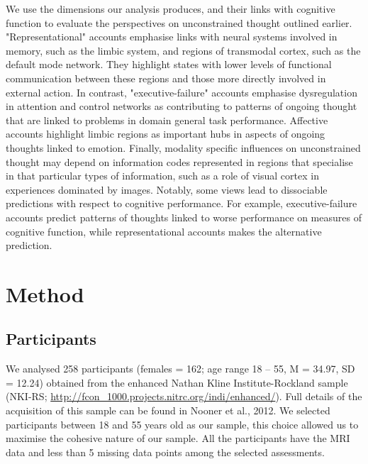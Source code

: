 We use the dimensions our analysis produces, and their links with cognitive function to evaluate the perspectives on unconstrained thought outlined earlier. "Representational" accounts emphasise links with neural systems involved in memory, such as the limbic system, and regions of transmodal cortex, such as the default mode network. They highlight states with lower levels of functional communication between these regions and those more directly involved in external action. In contrast, "executive-failure" accounts emphasise dysregulation in attention and control networks as contributing to patterns of ongoing thought that are linked to problems in domain general task performance. Affective accounts highlight limbic regions as important hubs in aspects of ongoing thoughts linked to emotion. Finally, modality specific influences on unconstrained thought may depend on information codes represented in regions that specialise in that particular types of information, such as a role of visual cortex in experiences dominated by images. Notably, some views lead to dissociable predictions with respect to cognitive performance. For example, executive-failure accounts predict patterns of thoughts linked to worse performance on measures of cognitive function, while representational accounts makes the alternative prediction.

\section{Method}
\label{study2:method}

\subsection{Participants}
\label{study2:method:participants}
We analysed 258 participants (females = 162; age range 18 – 55, M = 34.97, SD = 12.24) obtained from the enhanced Nathan Kline Institute-Rockland sample (NKI-RS; \url{http://fcon_1000.projects.nitrc.org/indi/enhanced/}).
Full details of the acquisition of this sample can be found in Nooner et al., 2012. 
We selected participants between 18 and 55 years old as our sample, this choice allowed us to maximise the cohesive nature of our sample.  All the participants have the MRI data and less than 5 missing data points among the selected assessments.

